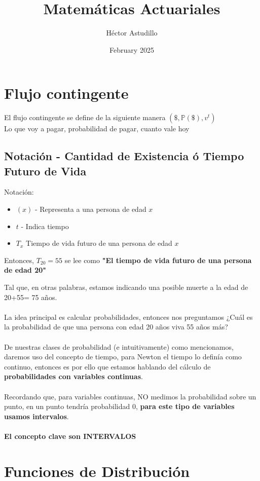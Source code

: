 \documentclass{article}
\title{Matemáticas Actuariales}
\author{Héctor Astudillo}
\date{February 2025}
\begin{document}
\maketitle

\section*{Flujo contingente}
El flujo contingente se define de la siguiente manera
\((\$,\mathbb{P}(\$),v^t )\)
\\
Lo que voy a pagar, probabilidad de pagar, cuanto vale hoy


\subsection*{Notación - Cantidad de Existencia ó Tiempo Futuro de Vida}
Notación:
\begin{itemize}
    \item \((x)\) - Representa a una persona de edad \(x\)
    \item \(t\) - Indica tiempo
    \item \(T_x\) Tiempo de vida futuro de una persona de edad \(x\)
\end{itemize}

Entonces, \(T_{20} = 55\) se lee como \textbf{"El tiempo de vida futuro de una persona de edad 20"}

Tal que, en otras palabras, estamos indicando una posible muerte a la edad de 20+55= 75 años.
\\\\
La idea principal es calcular probabilidades, entonces nos preguntamos ¿Cuál es la probabilidad de que una persona con edad 20 años viva 55 años más?
\\\\
De nuestras clases de probabilidad (e intuitivamente) como mencionamos, daremos uso del concepto de tiempo, para Newton el tiempo lo definía como continuo, entonces es por ello que estamos hablando del cálculo de \textbf{probabilidades con variables continuas}.
\\\\
Recordando que, para variables continuas, NO medimos la probabilidad sobre un punto, en un punto tendría probabilidad 0, \textbf{para este tipo de variables usamos intervalos}.
\\\\
\textbf{El concepto clave son INTERVALOS}

\section*{Funciones de Distribución}
\end{document}
